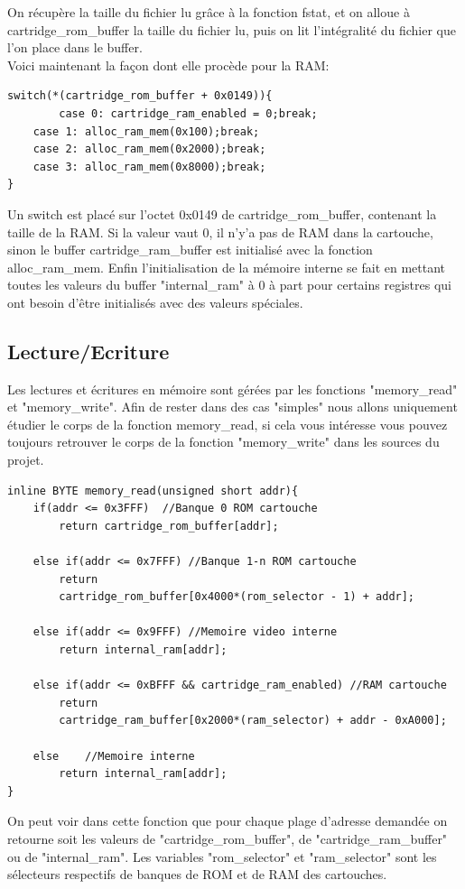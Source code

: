 \documentclass{report}
\begin{document}
On récupère la taille du fichier lu grâce à la fonction fstat, et on alloue à cartridge\_rom\_buffer la taille du fichier lu, puis on lit l'intégralité du fichier que l'on place dans le buffer.\\
Voici maintenant la façon dont elle procède pour la RAM:
\begin{lstlisting}
switch(*(cartridge_rom_buffer + 0x0149)){
       	case 0: cartridge_ram_enabled = 0;break;
	case 1: alloc_ram_mem(0x100);break;
	case 2: alloc_ram_mem(0x2000);break;
	case 3: alloc_ram_mem(0x8000);break;
}
\end{lstlisting}
Un switch est placé sur l'octet 0x0149 de cartridge\_rom\_buffer, contenant la taille de la RAM. Si la valeur vaut 0, il n'y'a pas de RAM dans la cartouche, sinon le buffer cartridge\_ram\_buffer est initialisé avec la fonction alloc\_ram\_mem.
Enfin l'initialisation de la mémoire interne se fait en mettant toutes les valeurs du buffer "internal\_ram" à 0 à part pour certains registres qui ont besoin d'être initialisés avec des valeurs spéciales.
\subsection{Lecture/Ecriture}
Les lectures et écritures en mémoire sont gérées par les fonctions "memory\_read" et "memory\_write". Afin de rester dans des cas "simples" nous allons uniquement étudier le corps de la fonction memory\_read, si cela vous intéresse vous pouvez toujours retrouver le corps de la fonction "memory\_write" dans les sources du projet.
\begin{lstlisting}
inline BYTE memory_read(unsigned short addr){
	if(addr <= 0x3FFF) 	//Banque 0 ROM cartouche
		return cartridge_rom_buffer[addr];

	else if(addr <= 0x7FFF) //Banque 1-n ROM cartouche
		return 
		cartridge_rom_buffer[0x4000*(rom_selector - 1) + addr];

	else if(addr <= 0x9FFF) //Memoire video interne
		return internal_ram[addr];

	else if(addr <= 0xBFFF && cartridge_ram_enabled) //RAM cartouche
		return 
		cartridge_ram_buffer[0x2000*(ram_selector) + addr - 0xA000];

	else 	//Memoire interne
		return internal_ram[addr];
}
\end{lstlisting}
On peut voir dans cette fonction que pour chaque plage d'adresse demandée on retourne soit les valeurs de "cartridge\_rom\_buffer", de "cartridge\_ram\_buffer" ou de "internal\_ram".
Les variables "rom\_selector" et "ram\_selector" sont les sélecteurs respectifs de banques de ROM et de RAM des cartouches.
\end{document}
